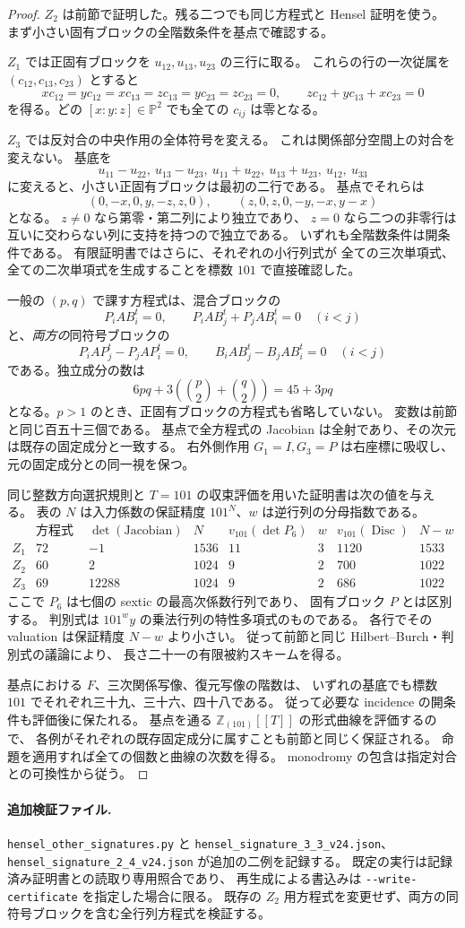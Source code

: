 \begin{proof}
$Z_2$ は前節で証明した。残る二つでも同じ方程式と Hensel 証明を使う。
まず小さい固有ブロックの全階数条件を基点で確認する。

$Z_1$ では正固有ブロックを $u_{12},u_{13},u_{23}$ の三行に取る。
これらの行の一次従属を $(c_{12},c_{13},c_{23})$ とすると
\[
 xc_{12}=yc_{12}=xc_{13}=zc_{13}=yc_{23}=zc_{23}=0,
 \qquad zc_{12}+yc_{13}+xc_{23}=0
\]
を得る。どの $[x:y:z]\in\mathbb P^2$ でも全ての $c_{ij}$ は零となる。

$Z_3$ では反対合の中央作用の全体符号を変える。
これは関係部分空間上の対合を変えない。
基底を
\[
 u_{11}-u_{22},\ u_{13}-u_{23},\
 u_{11}+u_{22},\ u_{13}+u_{23},\ u_{12},\ u_{33}
\]
に変えると、小さい正固有ブロックは最初の二行である。
基点でそれらは
\[
 (0,-x,0,y,-z,z,0),\qquad
 (z,0,z,0,-y,-x,y-x)
\]
となる。
$z\ne0$ なら第零・第二列により独立であり、
$z=0$ なら二つの非零行は互いに交わらない列に支持を持つので独立である。
いずれも全階数条件は開条件である。
有限証明書ではさらに、それぞれの小行列式が
全ての三次単項式、全ての二次単項式を生成することを標数 $101$ で直接確認した。

一般の $(p,q)$ で課す方程式は、混合ブロックの
\[
 P_iAB_i^t=0,\qquad P_iAB_j^t+P_jAB_i^t=0\quad(i<j)
\]
と、\emph{両方の}同符号ブロックの
\[
 P_iAP_j^t-P_jAP_i^t=0,\qquad
 B_iAB_j^t-B_jAB_i^t=0\quad(i<j)
\]
である。独立成分の数は
\[
 6pq+3\left(\binom p2+\binom q2\right)=45+3pq
\]
となる。$p>1$ のとき、正固有ブロックの方程式も省略していない。
変数は前節と同じ百五十三個である。
基点で全方程式の Jacobian は全射であり、その次元は既存の固定成分と一致する。
右外側作用 $G_1=I,G_3=P$ は右座標に吸収し、
元の固定成分との同一視を保つ。

同じ整数方向選択規則と $T=101$ の収束評価を用いた証明書は次の値を与える。
表の $N$ は入力係数の保証精度 $101^N$、$w$ は逆行列の分母指数である。
\[
\begin{array}{c|r|r|r|r|r|r|r}
 &\text{方程式数}&\det(\text{Jacobian})&N&v_{101}(\det P_6)&w&
 v_{101}(\operatorname{Disc})&N-w\\\hline
 Z_1&72&-1&1536&11&3&1120&1533\\
 Z_2&60&2&1024&9&2&700&1022\\
 Z_3&69&12288&1024&9&2&686&1022
\end{array}
\]
ここで $P_6$ は七個の sextic の最高次係数行列であり、
固有ブロック $P$ とは区別する。
判別式は $101^wy$ の乗法行列の特性多項式のものである。
各行でその valuation は保証精度 $N-w$ より小さい。
従って前節と同じ Hilbert--Burch・判別式の議論により、
長さ二十一の有限被約スキームを得る。

基点における $F$、三次関係写像、復元写像の階数は、
いずれの基底でも標数 $101$ でそれぞれ三十九、三十六、四十八である。
従って必要な incidence の開条件も評価後に保たれる。
基点を通る $\mathbb Z_{(101)}[[T]]$ の形式曲線を評価するので、
各例がそれぞれの既存固定成分に属すことも前節と同じく保証される。
命題を適用すれば全ての個数と曲線の次数を得る。
monodromy の包含は指定対合との可換性から従う。
\end{proof}

\paragraph{追加検証ファイル.}
\nolinkurl{hensel_other_signatures.py} と
\nolinkurl{hensel_signature_3_3_v24.json}、
\nolinkurl{hensel_signature_2_4_v24.json} が追加の二例を記録する。
既定の実行は記録済み証明書との読取り専用照合であり、
再生成による書込みは \nolinkurl{--write-certificate} を指定した場合に限る。
既存の $Z_2$ 用方程式を変更せず、両方の同符号ブロックを含む全行列方程式を検証する。
